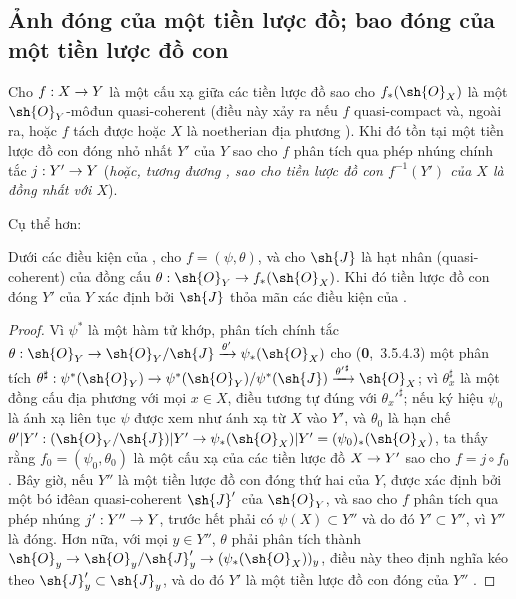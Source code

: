 \documentclass[oneside]{amsart}
\makeatletter
\newcommand{\ega@arrow}[2]{\mathchoice{#1}{#2}{#2}{#2}}
\renewcommand{\to}{\ega@arrow{\longrightarrow}{\rightarrow}}
\newcommand{\oldpage}[2][]{{\marginnote{\normalfont\textbf{#1}~|~#2}}\ignorespaces}
\let\EGAOriginalLabel\label
\renewcommand{\label}[1]{\phantomsection\EGAOriginalLabel{#1}}
\newcommand*{\ega@errmark}[1]{\textbf{Err}\textsubscript{#1}}
\newcommand{\erratum}[2][]{{#2}\marginpar{\footnotesize\ega@errmark{#1}}}
\makeatother
\begin{document}
\subsection{Ảnh đóng của một tiền lược đồ; bao đóng của một tiền lược đồ con}
\label{subsection:I.9.5}

\begin{proposition}[9.5.1]
\label{I.9.5.1}
Cho $f:X\to Y$ là một cấu xạ giữa các tiền lược đồ sao cho $f_*(\sh{O}_X)$ là một
$\sh{O}_Y$-môđun quasi-coherent (điều này xảy ra nếu $f$ quasi-compact và, ngoài ra,
hoặc $f$ tách được hoặc $X$ là noetherian địa phương ). Khi đó tồn tại
một tiền lược đồ con đóng nhỏ nhất $Y'$ của $Y$ sao cho $f$ phân tích qua phép nhúng chính tắc
$j:Y'\to Y$ (\emph{hoặc, tương đương , sao cho tiền lược đồ con
$f^{-1}(Y')$ của $X$ là \emph{đồng nhất} với $X$}).
\end{proposition}

Cụ thể hơn:
\begin{corollary}[9.5.2]
\label{I.9.5.2}
Dưới các điều kiện của , cho $f=(\psi,\theta)$, và cho $\sh{J}$ là
hạt nhân (quasi-coherent) của đồng cấu $\theta:\sh{O}_Y\to f_*(\sh{O}_X)$. Khi đó tiền
lược đồ con đóng $Y'$ của $Y$ xác định bởi $\sh{J}$ thỏa mãn các điều kiện của
.
\end{corollary}

\begin{proof}
Vì $\psi^*$ là một hàm tử khớp, phân tích chính tắc
$\theta:\sh{O}_Y\to\sh{O}_Y/\sh{J}\xrightarrow{\theta'}\psi_*(\sh{O}_X)$ cho (\textbf{0},~3.5.4.3)
một phân tích
$\theta^\sharp:\psi^*(\sh{O}_Y)\to\psi^*(\sh{O}_Y)/\psi^*(\sh{J})
  \xrightarrow{{\theta'}^\sharp}\sh{O}_X$; vì $\theta_x^\sharp$ là một đồng cấu địa phương với
mọi $x\in X$, điều tương tự đúng với ${\theta_x'}^\sharp$; nếu ký hiệu $\psi_0$ là
ánh xạ liên tục $\psi$ được xem như ánh xạ từ $X$ vào \erratum[II]{$Y'$}, và $\theta_0$ là hạn chế
$\theta'|Y':(\sh{O}_Y/\sh{J})|Y'\to\psi_*(\sh{O}_X)|Y'=(\psi_0)_*(\sh{O}_X)$, ta thấy rằng
$f_0=(\psi_0,\theta_0)$ là một cấu xạ của các tiền lược đồ $X\to Y'$  sao cho
$f=j\circ f_0$. Bây giờ, nếu $Y''$
\oldpage[I]{177}
là một tiền lược đồ con đóng thứ hai của $Y$, được xác định bởi một bó iđêan quasi-coherent $\sh{J}'$ của
$\sh{O}_Y$, và sao cho $f$ phân tích qua phép nhúng $j':Y''\to Y$, trước hết phải có
$\psi(X)\subset Y''$ và do đó $Y'\subset Y''$, vì $Y''$ là đóng.
Hơn nữa, với mọi $y\in Y''$, $\theta$ phải phân tích thành
$\sh{O}_y\to\sh{O}_y/\sh{J}'_y\to(\psi_*(\sh{O}_X))_y$, điều này theo định nghĩa kéo theo
$\sh{J}'_y\subset\sh{J}_y$, và do đó $Y'$ là một tiền lược đồ con đóng của $Y''$
.
\end{proof}
\end{document}
